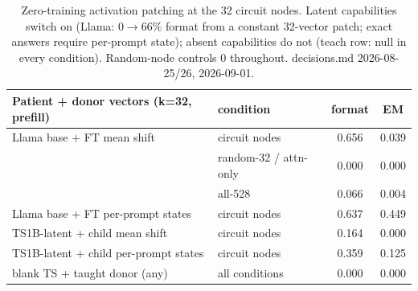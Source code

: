 \begin{table}[t]
\centering
\begin{tabular}{llcc}
\hline
Patient + donor vectors (k=32, prefill) & condition & format & EM \\
\hline
Llama base + FT mean shift & circuit nodes & 0.656 & 0.039 \\
 & random-32 / attn-only & 0.000 & 0.000 \\
 & all-528 & 0.066 & 0.004 \\
Llama base + FT per-prompt states & circuit nodes & 0.637 & 0.449 \\
TS1B-latent + child mean shift & circuit nodes & 0.164 & 0.000 \\
TS1B-latent + child per-prompt states & circuit nodes & 0.359 & 0.125 \\
blank TS + taught donor (any) & all conditions & 0.000 & 0.000 \\
\hline
\end{tabular}
\caption{Zero-training activation patching at the 32 circuit nodes. Latent capabilities switch on (Llama: 0$\to$66\% format from a constant 32-vector patch; exact answers require per-prompt state); absent capabilities do not (teach row: null in every condition). Random-node controls 0 throughout. decisions.md 2026-08-25/26, 2026-09-01.}
\label{tab:steering}
\end{table}
